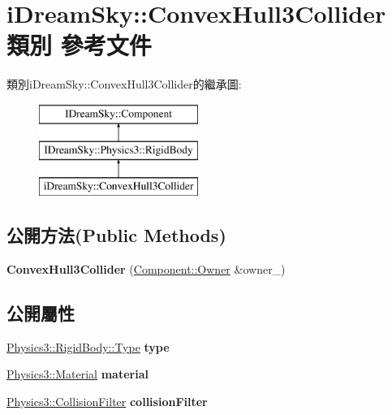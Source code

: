 \hypertarget{classi_dream_sky_1_1_convex_hull3_collider}{}\section{i\+Dream\+Sky\+:\+:Convex\+Hull3\+Collider 類別 參考文件}
\label{classi_dream_sky_1_1_convex_hull3_collider}
類別i\+Dream\+Sky\+:\+:Convex\+Hull3\+Collider的繼承圖\+:\begin{figure}[H]
\begin{center}
\leavevmode
\includegraphics[height=3.000000cm]{classi_dream_sky_1_1_convex_hull3_collider}
\end{center}
\end{figure}
\subsection*{公開方法(Public Methods)}
\begin{DoxyCompactItemize}
\item 
{\bfseries Convex\+Hull3\+Collider} (\hyperlink{class_i_dream_sky_1_1_component_1_1_owner}{Component\+::\+Owner} \&owner\+\_\+)\hypertarget{classi_dream_sky_1_1_convex_hull3_collider_abf85df7f61c3ad59fb65e7bc5eca0447}{}\label{classi_dream_sky_1_1_convex_hull3_collider_abf85df7f61c3ad59fb65e7bc5eca0447}

\end{DoxyCompactItemize}
\subsection*{公開屬性}
\begin{DoxyCompactItemize}
\item 
\hyperlink{class_i_dream_sky_1_1_physics3_1_1_rigid_body_a8a970d66442558ce0a3ce7b8009c14fa}{Physics3\+::\+Rigid\+Body\+::\+Type} {\bfseries type}\hypertarget{classi_dream_sky_1_1_convex_hull3_collider_af079b1ac3bbf08e30fd5300009e6d09b}{}\label{classi_dream_sky_1_1_convex_hull3_collider_af079b1ac3bbf08e30fd5300009e6d09b}

\item 
\hyperlink{class_i_dream_sky_1_1_physics3_1_1_material}{Physics3\+::\+Material} {\bfseries material}\hypertarget{classi_dream_sky_1_1_convex_hull3_collider_a14b2f37f716fad4b1f0a44ed834d7395}{}\label{classi_dream_sky_1_1_convex_hull3_collider_a14b2f37f716fad4b1f0a44ed834d7395}

\item 
\hyperlink{class_i_dream_sky_1_1_physics3_1_1_collision_filter}{Physics3\+::\+Collision\+Filter} {\bfseries collision\+Filter}\hypertarget{classi_dream_sky_1_1_convex_hull3_collider_a9307f3de186775efef94494d4d93220e}{}\label{classi_dream_sky_1_1_convex_hull3_collider_a9307f3de186775efef94494d4d93220e}

\end{DoxyCompactItemize}
